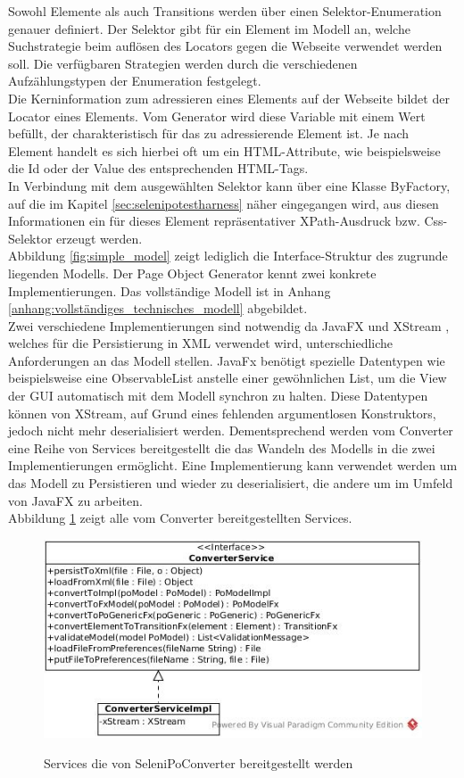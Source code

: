 Sowohl Elemente als auch Transitions werden über einen Selektor-Enumeration genauer definiert.
Der Selektor gibt für ein Element im Modell an, welche Suchstrategie beim auflösen des Locators gegen die Webseite verwendet werden soll.
Die verfügbaren Strategien werden durch die verschiedenen Aufzählungstypen der Enumeration festgelegt.\\
Die Kerninformation zum adressieren eines Elements auf der Webseite bildet der Locator eines Elements. Vom Generator wird diese Variable mit einem Wert befüllt, der charakteristisch für das zu adressierende Element ist. Je nach Element handelt es sich hierbei oft um ein HTML-Attribute, wie beispielsweise die Id oder der Value des entsprechenden HTML-Tags.\\
In Verbindung mit dem ausgewählten Selektor kann über eine Klasse ByFactory, auf die im Kapitel \ref{sec:selenipotestharness} näher eingegangen wird, aus diesen Informationen ein für dieses Element repräsentativer XPath-Ausdruck bzw. Css-Selektor erzeugt werden.\\
Abbildung \ref{fig:simple_model} zeigt lediglich die Interface-Struktur des zugrunde liegenden Modells. Der Page Object Generator kennt zwei konkrete Implementierungen. Das vollständige Modell ist in Anhang \ref{anhang:vollständiges_technisches_modell} abgebildet.\\
Zwei verschiedene Implementierungen sind notwendig da JavaFX und XStream \cite{joe_walnes_xstream_2015}, welches für die Persistierung in XML verwendet wird, unterschiedliche Anforderungen an das Modell stellen. JavaFx benötigt spezielle Datentypen wie beispielsweise eine ObservableList anstelle einer gewöhnlichen List, um die View der GUI automatisch mit dem Modell synchron zu halten. Diese Datentypen können von XStream, auf Grund eines fehlenden argumentlosen Konstruktors, jedoch nicht mehr deserialisiert werden.
Dementsprechend werden vom Converter eine Reihe von Services bereitgestellt die das Wandeln des Modells in die zwei Implementierungen ermöglicht. Eine Implementierung kann verwendet werden um das Modell zu Persistieren und wieder zu deserialisiert, die andere um im Umfeld von JavaFX zu arbeiten.\\
Abbildung \ref{fig:converter_service} zeigt alle vom Converter bereitgestellten Services. 

\begin{figure}[htb]
  \centering  
  \includegraphics[scale=0.5]{img/ConverterService.jpg}\\
  \caption{Services die von SeleniPoConverter bereitgestellt werden}
  \label{fig:converter_service}
\end{figure}

